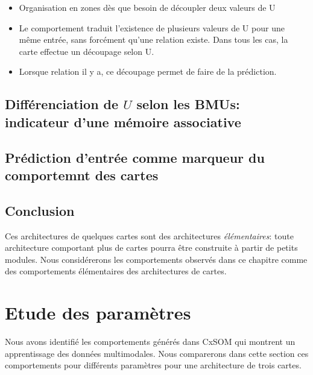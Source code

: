 \begin{itemize}
	\item Organisation en zones dès que besoin de découpler deux valeurs de U
	\item Le comportement traduit l'existence de plusieurs valeurs de U pour une même entrée, sans forcément qu'une relation existe. Dans tous les cas, la carte effectue un découpage selon U.
	\item Lorsque relation il y a, ce découpage permet de faire de la prédiction.
\end{itemize}

\subsection{Différenciation de $U$ selon les BMUs: indicateur d'une mémoire associative}

\subsection{Prédiction d'entrée comme marqueur du comportemnt des cartes}


\subsection{Conclusion}

Ces architectures de quelques cartes sont des architectures \emph{élémentaires}: toute architecture comportant plus de cartes pourra être construite à partir de petits modules. Nous considérerons les comportements observés dans ce chapitre comme des comportements élémentaires des architectures de cartes.

\section{Etude des paramètres}
Nous avons identifié les comportements générés dans CxSOM qui montrent un apprentissage des données multimodales. Nous comparerons dans cette section ces comportements pour différents paramètres pour une architecture de trois cartes.



